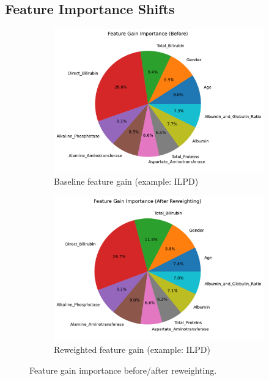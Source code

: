 \documentclass[sn-basic]{sn-jnl} %
\begin{document}
\subsection{Feature Importance Shifts}
\begin{figure}[H]
  \centering
  \begin{subfigure}{.49\linewidth}
    \centering
    \includegraphics[width=\linewidth]{fig_feat_gain_before.pdf}
    \caption{Baseline feature gain (example: ILPD)}
  \end{subfigure}\hfill
  \begin{subfigure}{.49\linewidth}
    \centering
    \includegraphics[width=\linewidth]{fig_feat_gain_after.pdf}
    \caption{Reweighted feature gain (example: ILPD)}
  \end{subfigure}
  \caption{Feature gain importance before/after reweighting.}
  \label{fig:featgain}
\end{figure}
\end{document}
